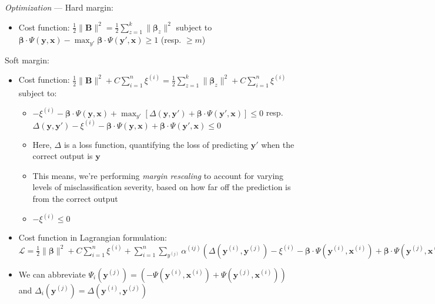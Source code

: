 \emph{Optimization} ---
Hard margin:
\begin{itemize}
    \item Cost function: $\frac{1}{2} \| \boldsymbol{B} \|^2 = \frac{1}{2} \sum_{z=1}^k \| \boldsymbol{\beta}_z \|^2 $ subject to $\boldsymbol{\beta} \cdot \Psi(\boldsymbol{y}, \boldsymbol{x}) - \max_{y'} \boldsymbol{\beta} \cdot \Psi(\boldsymbol{y}', \boldsymbol{x})  \geq 1$ (resp. $\geq m$) 
\end{itemize}
Soft margin:
\begin{itemize}
    \item Cost function: $\frac{1}{2} \| \boldsymbol{B} \|^2 + C \sum_{i=1}^n \xi^{(i)} = \frac{1}{2} \sum_{z=1}^k \| \boldsymbol{\beta}_z \|^2 + C \sum_{i=1}^n \xi^{(i)}$ subject to:
    \begin{itemize}
        \item $-\xi^{(i)} - \boldsymbol{\beta} \cdot \Psi(\boldsymbol{y}, \boldsymbol{x}) + \max_{y'} [ \Delta(\boldsymbol{y},\boldsymbol{y}') + \boldsymbol{\beta} \cdot \Psi(\boldsymbol{y}', \boldsymbol{x}) ] \leq 0$ resp. $\Delta(\boldsymbol{y},\boldsymbol{y}') -\xi^{(i)} - \boldsymbol{\beta} \cdot \Psi(\boldsymbol{y}, \boldsymbol{x}) +  \boldsymbol{\beta} \cdot \Psi(\boldsymbol{y}', \boldsymbol{x})  \leq 0$ 
        \item Here, $\Delta$ is a loss function, quantifying the loss of predicting $\boldsymbol{y}'$ when the correct output is $\boldsymbol{y}$
        \item This means, we're performing \emph{margin rescaling} to account for varying levels of misclassification severity, based on how far off the prediction is from the correct output
        \item $-\xi^{(i)} \leq 0$
    \end{itemize}
    \item Cost function in Lagrangian formulation: $\mathcal{L} = \frac{1}{2} \| \boldsymbol{\beta} \|^2 + C \sum_{i=1}^n \xi^{(i)} + \sum_{i=1}^n \sum_{y^{(j)}} \alpha^{(ij)} (\Delta(\boldsymbol{y}^{(i)},\boldsymbol{y}^{(j)}) -\xi^{(i)} - \boldsymbol{\beta} \cdot \Psi(\boldsymbol{y}^{(i)}, \boldsymbol{x}^{(i)}) +  \boldsymbol{\beta} \cdot \Psi(\boldsymbol{y}^{(j)}, \boldsymbol{x}^{(i)})) - \sum_{i=1}^n \zeta^{(i)} \xi^{(i)}$
    \item We can abbreviate $\Psi_i(\boldsymbol{y}^{(j)}) = (-\Psi(\boldsymbol{y}^{(i)}, \boldsymbol{x}^{(i)}) + \Psi(\boldsymbol{y}^{(j)}, \boldsymbol{x}^{(i)}))$ and $\Delta_i(\boldsymbol{y}^{(j)}) = \Delta(\boldsymbol{y}^{(i)},\boldsymbol{y}^{(j)})$

\end{itemize}
